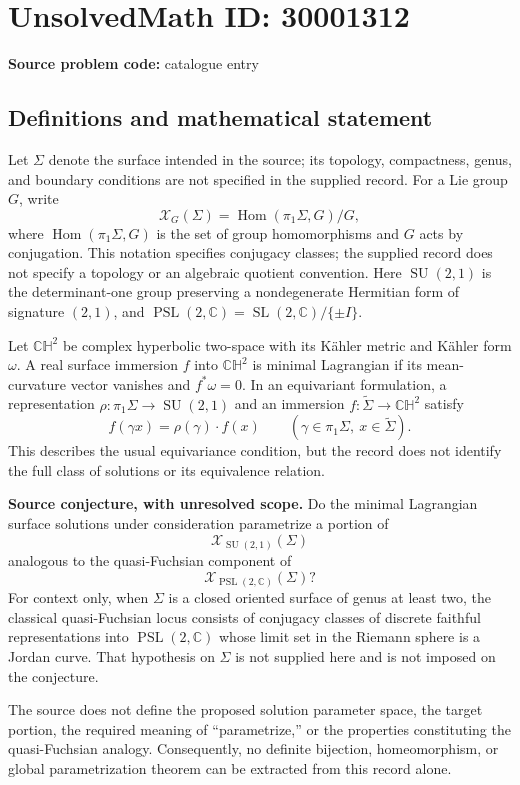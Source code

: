 \documentclass[11pt]{article}
\newcommand{\C}{\mathbb{C}}
\begin{document}
\section*{UnsolvedMath ID: 30001312}
\textbf{Source problem code:} catalogue entry
\subsection{Definitions and mathematical statement}
Let \(\Sigma\) denote the surface intended in the source; its topology, compactness, genus, and boundary conditions are not specified in the supplied record. For a Lie group \(G\), write
\[
\mathcal X_G(\Sigma)=\operatorname{Hom}(\pi_1\Sigma,G)/G,
\]
where \(\operatorname{Hom}(\pi_1\Sigma,G)\) is the set of group homomorphisms and \(G\) acts by conjugation. This notation specifies conjugacy classes; the supplied record does not specify a topology or an algebraic quotient convention. Here \(\operatorname{SU}(2,1)\) is the determinant-one group preserving a nondegenerate Hermitian form of signature \((2,1)\), and \(\operatorname{PSL}(2,\C)=\operatorname{SL}(2,\C)/\{\pm I\}\).

Let \(\mathbb{CH}^{2}\) be complex hyperbolic two-space with its Kähler metric and Kähler form \(\omega\). A real surface immersion \(f\) into \(\mathbb{CH}^{2}\) is minimal Lagrangian if its mean-curvature vector vanishes and \(f^*\omega=0\). In an equivariant formulation, a representation \(\rho:\pi_1\Sigma\to\operatorname{SU}(2,1)\) and an immersion \(f:\widetilde\Sigma\to\mathbb{CH}^{2}\) satisfy
\[
f(\gamma x)=\rho(\gamma)\cdot f(x)
\qquad(\gamma\in\pi_1\Sigma,\ x\in\widetilde\Sigma).
\]
This describes the usual equivariance condition, but the record does not identify the full class of solutions or its equivalence relation.

\textbf{Source conjecture, with unresolved scope.} Do the minimal Lagrangian surface solutions under consideration parametrize a portion of
\[
\mathcal X_{\operatorname{SU}(2,1)}(\Sigma)
\]
analogous to the quasi-Fuchsian component of
\[
\mathcal X_{\operatorname{PSL}(2,\C)}(\Sigma)?
\]
For context only, when \(\Sigma\) is a closed oriented surface of genus at least two, the classical quasi-Fuchsian locus consists of conjugacy classes of discrete faithful representations into \(\operatorname{PSL}(2,\C)\) whose limit set in the Riemann sphere is a Jordan curve. That hypothesis on \(\Sigma\) is not supplied here and is not imposed on the conjecture.

The source does not define the proposed solution parameter space, the target portion, the required meaning of ``parametrize,'' or the properties constituting the quasi-Fuchsian analogy. Consequently, no definite bijection, homeomorphism, or global parametrization theorem can be extracted from this record alone.
\end{document}
